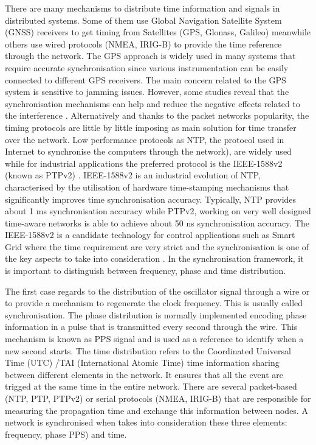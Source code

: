 There are many mechanisms to distribute time information and signals in distributed systems. Some of them use Global Navigation Satellite System (GNSS) receivers to get timing from Satellites (GPS, Glonass, Galileo) meanwhile others use wired protocols (NMEA, IRIG-B) to provide the time reference 
through the network. The GPS approach is widely used in many systems that require accurate synchronisation since various instrumentation can be easily connected to different GPS receivers. The main concern related to the GPS system is sensitive to jamming issues. However, some studies reveal that the synchronisation mechanisms can help and reduce the negative effects related to the interference \cite{NOURA2016130}. Alternatively and thanks to the packet networks popularity, the timing protocols are little by little imposing as main solution for time transfer over the network. Low performance protocols as NTP, the protocol used in Internet to synchronise the computers through the network), \cite{ntf:ntp_std} are widely used while for industrial applications the preferred protocol is the IEEE-1588v2 (known as PTPv2) \cite{ieee:ieee1588_std} \cite{itu:TG8275_1_Y_1369_1}. IEEE-1588v2 is an industrial evolution of NTP, characterised by the utilisation of hardware time-stamping mechanisms that significantly improves time synchronisation accuracy. Typically, NTP provides about 1 ms synchronisation accuracy while PTPv2, working on very well designed time-aware networks is able to achieve about 50 ns synchronisation accuracy. The IEEE-1588v2 is a candidate technology for control applications such as Smart Grid \cite{NAFI201623} where the time requirement are very strict and the synchronisation is one of the key aspects to take into consideration \cite{COLAK2016396}.
In the synchronisation framework, it is important to distinguish between frequency, phase and time distribution.

The first case regards to the distribution of the oscillator signal through a wire or to provide a mechanism to regenerate the clock frequency. This is usually  called synchronisation. 
The phase distribution is normally implemented encoding phase information in a pulse that is transmitted every second through the wire. This mechanism is known as PPS signal and is used as a reference to identify when a new second starts.
The time distribution refers to the Coordinated Universal Time (UTC) /TAI (International Atomic Time) time information sharing between different elements in the network. It ensures that all the event are trigged at the same time in the entire network. There are several packet-based (NTP, PTP, PTPv2) or serial protocols (NMEA, IRIG-B) that are responsible for measuring the propagation time and exchange this information between nodes. 
A network is synchronised when takes into consideration these three elements: frequency, phase PPS) and time.


